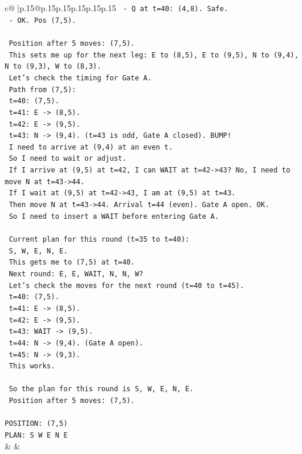 \documentclass{article}
\begin{document}
{\begin{supertabular}{c@{$\;$}|p{.15\linewidth}@{}p{.15\linewidth}p{.15\linewidth}p{.15\linewidth}p{.15\linewidth}p{.15\linewidth}}
{{{\texttt{      {-} Q at t=40: (4,8). Safe.} \\
\texttt{      {-} OK. Pos (7,5).} \\
\\ 
\texttt{    Position after 5 moves: (7,5).} \\
\texttt{    This sets me up for the next leg: E to (8,5), E to (9,5), N to (9,4), N to (9,3), W to (8,3).} \\
\texttt{    Let's check the timing for Gate A.} \\
\texttt{    Path from (7,5):} \\
\texttt{    t=40: (7,5).} \\
\texttt{    t=41: E {-}> (8,5).} \\
\texttt{    t=42: E {-}> (9,5).} \\
\texttt{    t=43: N {-}> (9,4). (t=43 is odd, Gate A closed). BUMP!} \\
\texttt{    I need to arrive at (9,4) at an even t.} \\
\texttt{    So I need to wait or adjust.} \\
\texttt{    If I arrive at (9,5) at t=42, I can WAIT at t=42{-}>43? No, I need to move N at t=43{-}>44.} \\
\texttt{    If I wait at (9,5) at t=42{-}>43, I am at (9,5) at t=43.} \\
\texttt{    Then move N at t=43{-}>44. Arrival t=44 (even). Gate A open. OK.} \\
\texttt{    So I need to insert a WAIT before entering Gate A.} \\
\\ 
\texttt{    Current plan for this round (t=35 to t=40):} \\
\texttt{    S, W, E, N, E.} \\
\texttt{    This gets me to (7,5) at t=40.} \\
\texttt{    Next round: E, E, WAIT, N, N, W?} \\
\texttt{    Let's check the moves for the next round (t=40 to t=45).} \\
\texttt{    t=40: (7,5).} \\
\texttt{    t=41: E {-}> (8,5).} \\
\texttt{    t=42: E {-}> (9,5).} \\
\texttt{    t=43: WAIT {-}> (9,5).} \\
\texttt{    t=44: N {-}> (9,4). (Gate A open).} \\
\texttt{    t=45: N {-}> (9,3).} \\
\texttt{    This works.} \\
\\ 
\texttt{    So the plan for this round is S, W, E, N, E.} \\
\texttt{    Position after 5 moves: (7,5).} \\
\\ 
\texttt{POSITION: (7,5)} \\
\texttt{PLAN: S W E N E} \\
            }
        }
    }
    & & \\ \\


\end{supertabular}}
\end{document}
